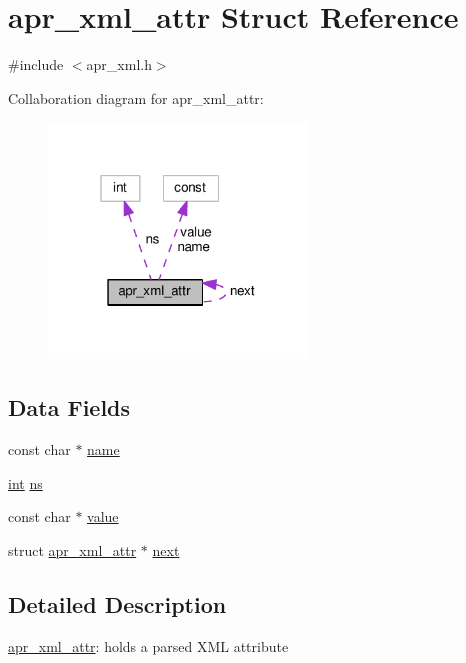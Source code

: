 \hypertarget{structapr__xml__attr}{}\section{apr\+\_\+xml\+\_\+attr Struct Reference}
\label{structapr__xml__attr}


{\ttfamily \#include $<$apr\+\_\+xml.\+h$>$}



Collaboration diagram for apr\+\_\+xml\+\_\+attr\+:
\nopagebreak
\begin{figure}[H]
\begin{center}
\leavevmode
\includegraphics[width=196pt]{structapr__xml__attr__coll__graph}
\end{center}
\end{figure}
\subsection*{Data Fields}
\begin{DoxyCompactItemize}
\item 
const char $\ast$ \hyperlink{structapr__xml__attr_a2ac25d74e3fd8a521b70af15ae8c1257}{name}
\item 
\hyperlink{pcre_8txt_a42dfa4ff673c82d8efe7144098fbc198}{int} \hyperlink{structapr__xml__attr_ad08daf8b0b47796aae04b6aeaa332bc2}{ns}
\item 
const char $\ast$ \hyperlink{structapr__xml__attr_a12f0f611e426fe83704de92b3b11d2e3}{value}
\item 
struct \hyperlink{structapr__xml__attr}{apr\+\_\+xml\+\_\+attr} $\ast$ \hyperlink{structapr__xml__attr_a89a314d3136128eb2a37146ddb30da4f}{next}
\end{DoxyCompactItemize}


\subsection{Detailed Description}
\hyperlink{structapr__xml__attr}{apr\+\_\+xml\+\_\+attr}\+: holds a parsed X\+ML attribute 

